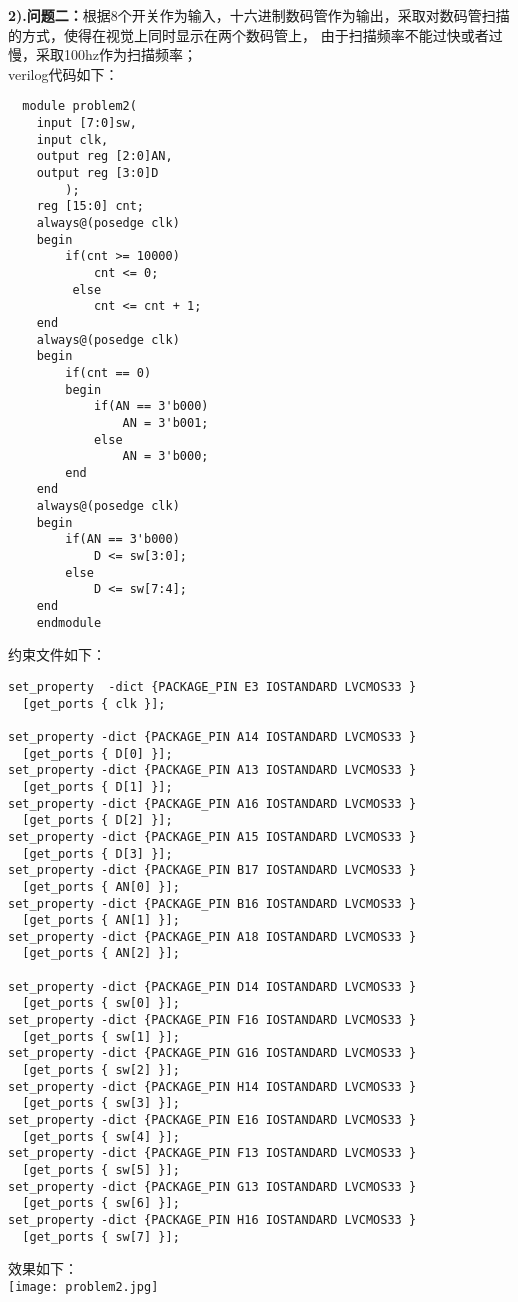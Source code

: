 \documentclass[12pt]{ctexart}
\begin{document}
{\bf2).问题二：}根据8个开关作为输入，十六进制数码管作为输出，采取对数码管扫描的方式，使得在视觉上同时显示在两个数码管上，
由于扫描频率不能过快或者过慢，采取100hz作为扫描频率；\\
verilog代码如下：
\begin{lstlisting}
  module problem2(
    input [7:0]sw,
    input clk,
    output reg [2:0]AN,
    output reg [3:0]D
        );
    reg [15:0] cnt;
    always@(posedge clk)
    begin
        if(cnt >= 10000)
            cnt <= 0;
         else
            cnt <= cnt + 1;
    end
    always@(posedge clk)
    begin
        if(cnt == 0)
        begin
            if(AN == 3'b000)
                AN = 3'b001;
            else    
                AN = 3'b000;
        end 
    end
    always@(posedge clk)
    begin
        if(AN == 3'b000)
            D <= sw[3:0];
        else 
            D <= sw[7:4];
    end
    endmodule
\end{lstlisting}
约束文件如下：
\begin{lstlisting}
set_property  -dict {PACKAGE_PIN E3 IOSTANDARD LVCMOS33 } 
  [get_ports { clk }]; 

set_property -dict {PACKAGE_PIN A14 IOSTANDARD LVCMOS33 } 
  [get_ports { D[0] }];
set_property -dict {PACKAGE_PIN A13 IOSTANDARD LVCMOS33 } 
  [get_ports { D[1] }];
set_property -dict {PACKAGE_PIN A16 IOSTANDARD LVCMOS33 } 
  [get_ports { D[2] }];
set_property -dict {PACKAGE_PIN A15 IOSTANDARD LVCMOS33 } 
  [get_ports { D[3] }];
set_property -dict {PACKAGE_PIN B17 IOSTANDARD LVCMOS33 } 
  [get_ports { AN[0] }];
set_property -dict {PACKAGE_PIN B16 IOSTANDARD LVCMOS33 } 
  [get_ports { AN[1] }];
set_property -dict {PACKAGE_PIN A18 IOSTANDARD LVCMOS33 } 
  [get_ports { AN[2] }];

set_property -dict {PACKAGE_PIN D14 IOSTANDARD LVCMOS33 } 
  [get_ports { sw[0] }];
set_property -dict {PACKAGE_PIN F16 IOSTANDARD LVCMOS33 } 
  [get_ports { sw[1] }];
set_property -dict {PACKAGE_PIN G16 IOSTANDARD LVCMOS33 } 
  [get_ports { sw[2] }];
set_property -dict {PACKAGE_PIN H14 IOSTANDARD LVCMOS33 } 
  [get_ports { sw[3] }];
set_property -dict {PACKAGE_PIN E16 IOSTANDARD LVCMOS33 } 
  [get_ports { sw[4] }];
set_property -dict {PACKAGE_PIN F13 IOSTANDARD LVCMOS33 } 
  [get_ports { sw[5] }];
set_property -dict {PACKAGE_PIN G13 IOSTANDARD LVCMOS33 } 
  [get_ports { sw[6] }];
set_property -dict {PACKAGE_PIN H16 IOSTANDARD LVCMOS33 } 
  [get_ports { sw[7] }];
\end{lstlisting}
效果如下：\\
\texttt{[image: problem2.jpg]}\\
\end{document}
